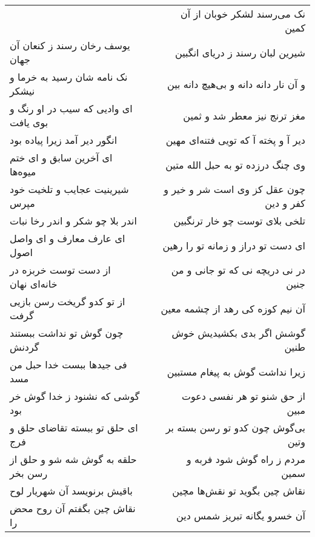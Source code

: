 \begin{center}
\begin{longtable}{l p{0.5cm} r}
&&
نک می‌رسند لشکر خوبان از آن کمین
\\
یوسف رخان رسند ز کنعان آن جهان
&&
شیرین لبان رسند ز دریای انگبین
\\
نک نامه شان رسید به خرما و نیشکر
&&
و آن نار دانه دانه و بی‌هیچ دانه بین
\\
ای وادیی که سیب در او رنگ و بوی یافت
&&
مغز ترنج نیز معطر شد و ثمین
\\
انگور دیر آمد زیرا پیاده بود
&&
دیر آ و پخته آ که تویی فتنه‌ای مهین
\\
ای آخرین سابق و ای ختم میوه‌ها
&&
وی چنگ درزده تو به حبل الله متین
\\
شیرینیت عجایب و تلخیت خود مپرس
&&
چون عقل کز وی است شر و خیر و کفر و دین
\\
اندر بلا چو شکر و اندر رخا نبات
&&
تلخی بلای توست چو خار ترنگبین
\\
ای عارف معارف و ای واصل اصول
&&
ای دست تو دراز و زمانه تو را رهین
\\
از دست توست خربزه در خانه‌ای نهان
&&
در نی دریچه نی که تو جانی و من جنین
\\
از تو کدو گریخت رسن بازیی گرفت
&&
آن نیم کوزه کی رهد از چشمه معین
\\
چون گوش تو نداشت ببستند گردنش
&&
گوشش اگر بدی بکشیدیش خوش طنین
\\
فی جیدها ببست خدا حبل من مسد
&&
زیرا نداشت گوش به پیغام مستبین
\\
گوشی که نشنود ز خدا گوش خر بود
&&
از حق شنو تو هر نفسی دعوت مبین
\\
ای حلق تو ببسته تقاضای حلق و فرج
&&
بی‌گوش چون کدو تو رسن بسته بر وتین
\\
حلقه به گوش شه شو و حلق از رسن بخر
&&
مردم ز راه گوش شود فربه و سمین
\\
باقیش برنویسد آن شهریار لوح
&&
نقاش چین بگوید تو نقش‌ها مچین
\\
نقاش چین بگفتم آن روح محض را
&&
آن خسرو یگانه تبریز شمس دین
\\
\end{longtable}
\end{center}
